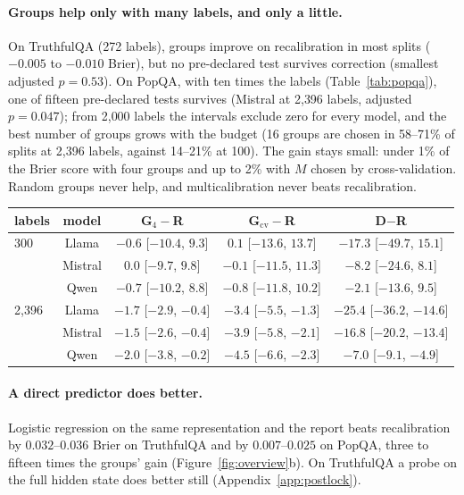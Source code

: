 \documentclass[11pt]{article}
\theoremstyle{definition}
\theoremstyle{remark}
\newcommand{\1}{\mathbf{1}}
\begin{document}
\paragraph{Groups help only with many labels, and only a little.} On TruthfulQA (272 labels),
groups improve on recalibration in most splits ($-0.005$ to $-0.010$ Brier), but no pre-declared test survives
correction (smallest adjusted $p=0.53$). On PopQA, with ten times the labels (Table~\ref{tab:popqa}), one of
fifteen pre-declared tests survives (Mistral at 2{,}396 labels, adjusted $p=0.047$); from 2{,}000 labels the
intervals exclude zero for every model, and the best number of groups grows with the budget (16 groups are
chosen in 58--71\% of splits at 2{,}396 labels, against 14--21\% at 100). The gain stays small: under 1\% of
the Brier score with four groups and up to 2\% with $M$ chosen by cross-validation. Random groups never help,
and multicalibration never beats recalibration.
\begin{center}\small
\begin{tabular}{lcccc}
\toprule
labels & model & G$_4-$R & G$_{\mathrm{cv}}-$R & D$-$R\\
\midrule
300  & Llama   & $-0.6$ [$-10.4$, $9.3$] & $0.1$ [$-13.6$, $13.7$] & $-17.3$ [$-49.7$, $15.1$]\\
     & Mistral & $0.0$ [$-9.7$, $9.8$]   & $-0.1$ [$-11.5$, $11.3$] & $-8.2$ [$-24.6$, $8.1$]\\
     & Qwen    & $-0.7$ [$-10.2$, $8.8$] & $-0.8$ [$-11.8$, $10.2$] & $-2.1$ [$-13.6$, $9.5$]\\
2{,}396 & Llama   & $-1.7$ [$-2.9$, $-0.4$] & $-3.4$ [$-5.5$, $-1.3$] & $-25.4$ [$-36.2$, $-14.6$]\\
     & Mistral & $-1.5$ [$-2.6$, $-0.4$] & $-3.9$ [$-5.8$, $-2.1$] & $-16.8$ [$-20.2$, $-13.4$]\\
     & Qwen    & $-2.0$ [$-3.8$, $-0.2$] & $-4.5$ [$-6.6$, $-2.3$] & $-7.0$ [$-9.1$, $-4.9$]\\
\bottomrule
\end{tabular}
\label{tab:popqa}
\end{center}

\paragraph{A direct predictor does better.}  Logistic regression on the same representation and the report
beats recalibration by $0.032$--$0.036$ Brier on TruthfulQA and by $0.007$--$0.025$ on PopQA, three to fifteen
times the groups' gain (Figure~\ref{fig:overview}b). On TruthfulQA a probe on the full hidden state does better
still (Appendix~\ref{app:postlock}).
\end{document}
